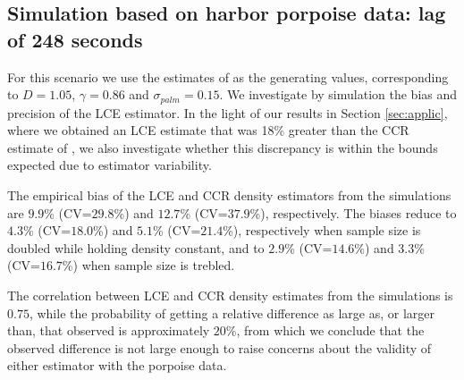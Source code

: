 \documentclass[useAMS, usenatbib, referee]{biom}\usepackage[]{graphicx}\usepackage[]{color}
\begin{document}

\subsection{Simulation based on harbor porpoise data: lag of 248 seconds}

For this scenario we use the estimates of \cite{Stevenson+al:18} as the generating values, corresponding to $D=1.05$, $\gamma=0.86$ and $\sigma_{palm}=0.15$. We investigate by simulation the bias and precision of the LCE estimator. In the light of our results in Section \ref{sec:applic}, where we obtained an LCE estimate that was 18\% greater than the CCR estimate of \cite{Stevenson+al:18}, we also investigate whether this discrepancy is within the bounds expected due to estimator variability.





The empirical bias of the LCE and CCR density estimators from the simulations are $9.9$\% (CV=$29.8$\%) and $12.7$\% (CV=$37.9$\%), respectively. The biases reduce to $4.3$\% (CV=$18.0$\%) and $5.1$\% (CV=$21.4$\%), respectively when sample size is doubled while holding density constant, and to $2.9$\% (CV=$14.6$\%) and $3.3$\% (CV=$16.7$\%) when sample size is trebled.


The correlation between LCE and CCR density estimates from the simulations is $0.75$, while the probability of getting a relative difference as large as, or larger than, that observed is approximately $20$\%, from which we conclude that the observed difference is not large enough to raise concerns about the validity of either estimator with the porpoise data.
\end{document}
